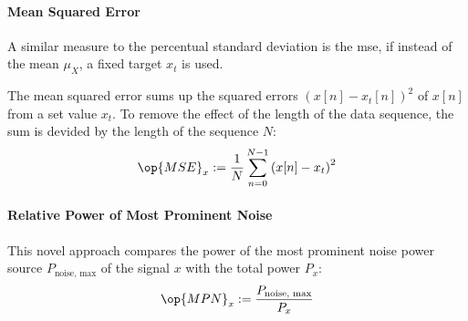 \paragraph{Mean Squared Error}
A similar measure to the percentual standard deviation is the \gls{mse}, if instead of the mean $\mu_X$, a fixed target $x_t$ is used.

The mean squared error sums up the squared errors $\left(x[n] - x_t[n]\right)^2$ of $x[n]$ from a set value $x_t$. To remove the effect of the length of the data sequence, the sum is devided by the length of the sequence $N$:
\begin{equation}
\op{MSE}_x := \frac{1}{N} \sum_{n=0}^{N-1} \left(x[n] - x_t\right)^2
\end{equation}

\paragraph{Relative Power of Most Prominent Noise}
This novel approach compares the power of the most prominent noise power source $P_\text{noise, max}$ of the signal $x$ with the total power $P_x$:
\begin{equation}\label{eq:mpn}
\op{MPN}_x := \frac{P_\text{noise, max}}{P_x}
\end{equation}

